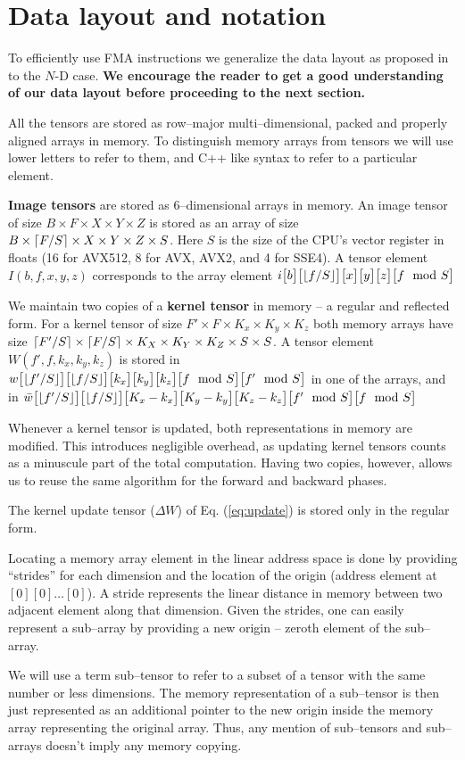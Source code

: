 \section{Data layout and notation}

  To efficiently use FMA instructions we generalize the data layout as
  proposed in~\cite{jeffers2016knl, cpu-myth} to the $N$-D
  case.  {\bf We encourage the reader to get a good understanding of
    our data layout before proceeding to the next section.}

  All the tensors are stored as row--major multi--dimensional, packed
  and properly aligned arrays in memory.  To distinguish memory arrays
  from tensors we will use lower letters to refer to them, and C++
  like syntax to refer to a particular element.

  {\bf Image tensors} are stored as 6--dimensional arrays in memory.
  An image tensor of size $B \times F \times X \times Y \times Z$ is
  stored as an array of size $B \times \lceil F/S\rceil \times X \times Y
  \times Z \times S$.  Here $S$ is the size of the CPU's vector
  register in floats (16 for AVX512, 8 for AVX, AVX2, and 4 for SSE4).
  A tensor element $I(b,f,x,y,z)$ corresponds to the array element
  $i\big[b\big]\big[\lfloor f/S\rfloor\big]\big[x\big]\big[y\big]\big[z\big]\big[f\mod S\big]$

  We maintain two copies of a {\bf kernel tensor} in memory -- a
  regular and reflected form.  For a kernel tensor of size $F' \times
  F \times K_x \times K_y \times K_z$ both memory arrays have size
  $\lceil F'/S\rceil \times \lceil F/S\rceil \times K_X \times K_Y \times K_Z
  \times S \times S$.  A tensor element $W(f',f,k_x,k_y,k_z)$ is
  stored in $w\big[\lfloor f'/S\rfloor\big]
  \big[\lfloor f/S\rfloor\big]\big[k_x\big]\big[k_y\big]\big[k_z\big]\big[f\mod S\big]\big[f'
    \mod S\big]$ in one of the arrays, and in $\bar{w}\big[\lfloor f'/S\rfloor\big]
  \big[\lfloor f/S\rfloor\big]\big[K_x-k_x\big]\big[K_y-k_y\big]\big[K_z-k_z\big]\big[f'\mod
    S\big]\big[f\mod S\big]$

  Whenever a kernel tensor is updated, both representations in
  memory are modified.  This introduces negligible overhead, as
  updating kernel tensors counts as a minuscule part of the total
  computation.  Having two copies, however, allows us to reuse the
  same algorithm for the forward and backward phases.

  The kernel update tensor ($\Delta W$) of Eq. (\ref{eq:update}) is
  stored only in the regular form.

  Locating a memory array element in the linear address space is done
  by providing ``strides'' for each dimension and the location of the
  origin (address element at $[0][0]\dots[0]$).  A stride represents
  the linear distance in memory between two adjacent element along
  that dimension.  Given the strides, one can easily represent a
  sub--array by providing a new origin -- zeroth element of the
  sub--array.

  We will use a term sub--tensor to refer to a subset of a tensor with
  the same number or less dimensions.  The memory representation of a
  sub--tensor is then just represented as an additional pointer to the
  new origin inside the memory array representing the original array.
  Thus, any mention of sub--tensors and sub--arrays doesn't imply any
  memory copying.
